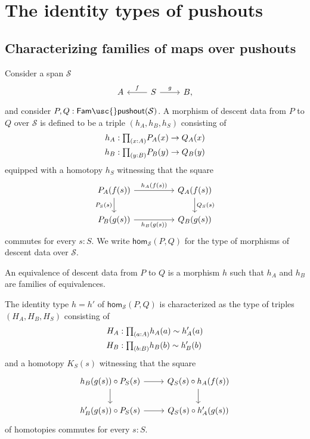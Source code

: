 \section{The identity types of pushouts}

\subsection{Characterizing families of maps over pushouts}
  
\begin{defn}
    Consider a span $\mathcal{S}$
  \begin{equation*}
    \begin{tikzcd}
      A & S \arrow[l,swap,"f"] \arrow[r,"g"] & B,
    \end{tikzcd}
  \end{equation*}
  and consider $P,Q:\mathsf{Fam\usc{}pushout}(\mathcal{S})$.
  A morphism of descent data from $P$ to $Q$ over $\mathcal{S}$ is defined to be a triple $(h_A,h_B,h_S)$ consisting of
  \begin{align*}
    h_A & : \prd{x:A} P_A(x)\to Q_A(x) \\
    h_B & : \prd{y:B} P_B(y)\to Q_B(y)
  \end{align*}
  equipped with a homotopy $h_S$ witnessing that the square
  \begin{equation*}
    \begin{tikzcd}[column sep=huge]
      P_A(f(s)) \arrow[r,"h_A(f(s))"] \arrow[d,swap,"P_S(s)"] & Q_A(f(s)) \arrow[d,"Q_S(s)"] \\
      P_B(g(s)) \arrow[r,swap,"h_B(g(s))"] & Q_B(g(s))
    \end{tikzcd}
  \end{equation*}
  commutes for every $s:S$. We write $\mathsf{hom}_{\mathcal{S}}(P,Q)$ for the type of morphisms of descent data over $\mathcal{S}$.

  An equivalence of descent data from $P$ to $Q$ is a morphism $h$ such that $h_A$ and $h_B$ are families of equivalences.
\end{defn}

\begin{rmk}
  The identity type $h=h'$ of $\mathsf{hom}_{\mathcal{S}}(P,Q)$ is characterized as the type of triples $(H_A,H_B,H_S)$ consisting of
  \begin{align*}
    H_A & : \prd{a:A} h_A(a)\htpy h'_A(a) \\
    H_B & : \prd{b:B} h_B(b)\htpy h'_B(b)
  \end{align*}
  and a homotopy $K_S(s)$ witnessing that the square
  \begin{equation*}
    \begin{tikzcd}
      h_B(g(s))\circ P_S(s) \arrow[d] \arrow[r] & Q_S(s)\circ h_A(f(s)) \arrow[d] \\
      h'_B(g(s))\circ P_S(s) \arrow[r] & Q_S(s)\circ h'_A(g(s))
    \end{tikzcd}
  \end{equation*}
  of homotopies commutes for every $s:S$.
\end{rmk}

